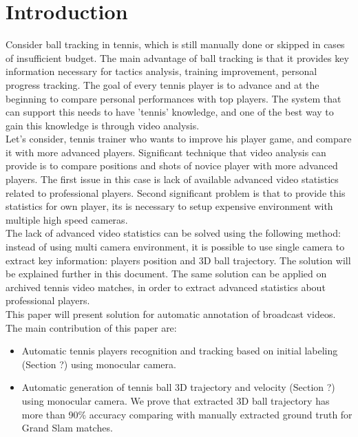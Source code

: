 \chapter{Introduction} \label{chap:intro}


Consider ball tracking in tennis, which is still manually done or skipped in cases of insufficient budget. The main advantage of ball tracking is that it provides key information necessary for tactics analysis, training improvement, personal progress tracking. The goal of every tennis player is to advance and at the beginning to compare personal performances with top players.  The system that can support this needs to have 'tennis' knowledge, and one of the best way to gain this knowledge is through video analysis.  \\

Let's consider, tennis trainer who wants to improve his player game, and compare it with more advanced players. Significant technique that video analysis can provide is to compare positions and shots of novice player with more advanced players. The first issue in this case is lack of available advanced video statistics related to professional players.  Second significant problem is that to provide this statistics for own player, its is necessary to setup expensive environment with multiple high speed cameras. \\

The lack of advanced video statistics can be solved using the following method: instead of using multi camera environment,  it is possible to use single camera to extract key information: players position and 3D ball trajectory. The solution will be explained further in this document. The same solution can be applied on archived tennis video matches, in order to extract advanced statistics about professional players.\\


This paper will present solution for automatic annotation of broadcast videos. The main contribution of this paper are:
\begin{itemize}
	\item Automatic tennis players recognition and tracking based on initial labeling (Section ?) using monocular camera. 
	\item Automatic generation of tennis ball 3D trajectory and velocity (Section ?) using monocular camera. We prove that extracted 3D ball trajectory has more than 90\% accuracy comparing with manually extracted ground truth for Grand Slam matches.   
\end{itemize}